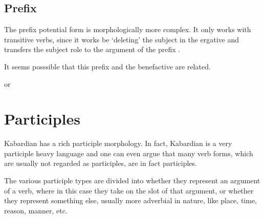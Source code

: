\documentclass[a4paper, 10pt]{book}
\begin{document}
\subsection{Prefix }
The prefix potential form is morphologically more complex. It only works with transitive verbs, since it works be `deleting' the subject in the ergative and transfers the subject role to the argument of the prefix .

\begin{exe}
    \ex
    \begin{xlist}
    \item {}
    \item {}
    \item {}
\end{xlist}
\end{exe}

It seems posssible that this prefix and the benefactive  are related.
\begin{exe}
    \ex
    \begin{xlist}
    \item {}
    \item {}
    \item {} or 
    \item {}
\end{xlist}
\end{exe}


\section{Participles}
Kabardian has a rich participle morphology. In fact, Kabardian is a very participle heavy language and one can even argue that many verb forms, which are usually not regarded as participles, are in fact participles.

The various participle types are divided into whether they represent an argument of a verb, where in this case they take on the slot of that argument, or whether they represent something else, usually more adverbial in nature, like place, time, reason, manner, etc.
\end{document}
